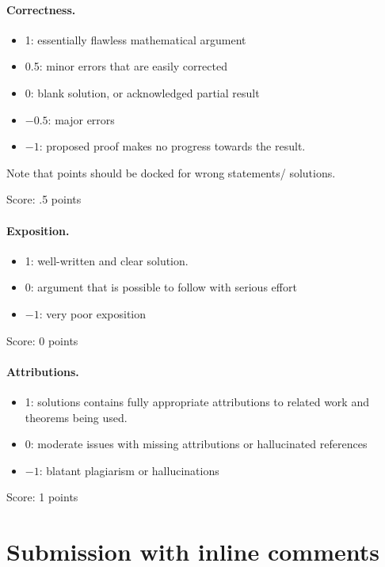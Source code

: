 \documentclass[11pt]{article}
\theoremstyle{remark}
\begin{document}
\paragraph{Correctness.}
\begin{itemize}
	\item  1: essentially flawless mathematical argument
	\item  0.5: minor errors that are easily corrected
	\item  0: blank solution, or acknowledged partial result
	\item  $-0.5$: major errors
	\item  $-1$: proposed proof makes no progress towards the result.
\end{itemize}
Note that points should be docked for wrong statements/ solutions.

\noindent Score: .5 points

\paragraph{Exposition.}
\begin{itemize}
	\item  1: well-written and clear solution.
	\item  0: argument that is possible to follow with serious effort
	\item  $-1$: very poor exposition
\end{itemize}

\noindent Score: 0 points

\paragraph{Attributions.}
\begin{itemize}
	\item  1: solutions contains fully appropriate attributions
		to related work and theorems being used.
	\item  0: moderate issues with missing attributions or hallucinated references
	\item  $-1$: blatant plagiarism or hallucinations
\end{itemize}

\noindent Score: 1 points

\newpage
\section{Submission with inline comments}
\end{document}
